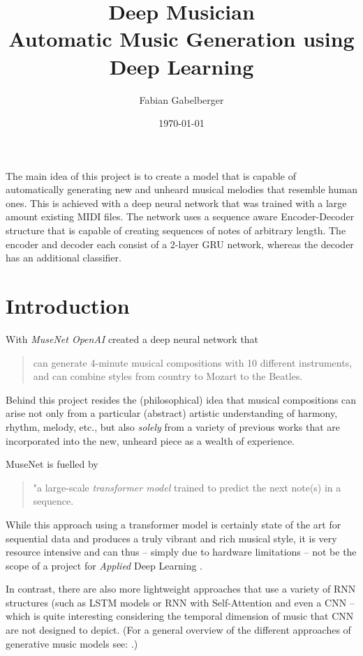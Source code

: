 \documentclass[a4paper, 10pt, xcolor=dvipsnames]{article} %
\date{\vspace{-9ex}} %
\title{Deep Musician
\vspace{0.25em}
\\ \large Automatic Music Generation using Deep Learning
}
\author{Fabian Gabelberger}
\date{\today}
\renewenvironment{abstract}
 {\small
  \begin{center}
  \bfseries \abstractname\vspace{-.5em}\vspace{0pt}
  \end{center}
  \list{}{
    \setlength{\leftmargin}{3cm}%
    \setlength{\rightmargin}{\leftmargin}%
  }%
  \item\relax}
 {\endlist}
\begin{document}
\maketitle
\vspace{2em}

\begin{abstract}
  The main idea of this project is to create a model that is capable of
  automatically generating new and unheard musical melodies that resemble human
  ones. This is achieved with a deep neural network that was trained with a
  large amount existing MIDI files. The network uses a sequence aware
  Encoder-Decoder structure that is capable of creating sequences of notes of
  arbitrary length. The encoder and decoder each consist of a 2-layer GRU
  network, whereas the decoder has an additional classifier.
\end{abstract}

\section{Introduction}
With \emph{MuseNet OpenAI} created a deep neural network that
\blockcquote{payne2019}{can generate 4-minute musical compositions with 10
  different instruments, and can combine styles from country to Mozart to the
  Beatles.} Behind this project resides the (philosophical) idea that musical
compositions can arise not only from a particular (abstract) artistic
understanding of harmony, rhythm, melody, etc., but also \emph{solely} from a
variety of previous works that are incorporated into the new, unheard piece as
a wealth of experience.

MuseNet is fuelled by \blockcquote{payne2019}{"a large-scale \emph{transformer
    model} trained to predict the next note(s) in a sequence.} While this
approach using a transformer model is certainly state of the art for
sequential data and produces a truly vibrant and rich musical style, it is
very resource intensive and can thus -- simply due to hardware limitations
-- not be the scope of a project for \emph{Applied} Deep Learning .

In contrast, there are also more lightweight approaches that use a variety of
RNN structures (such as LSTM models or RNN \cite{lewandowski2012,
  jedrzejewska2018, hewahi2019, ycart2017, mangal2019} with Self-Attention
\cite{jagannathan2022} and even a CNN \cite{yang2017} -- which is quite
interesting considering the temporal dimension of music that CNN are not
designed to depict. (For a general overview of the different approaches of
generative music models see: \cite{briot2017}.)
\end{document}
